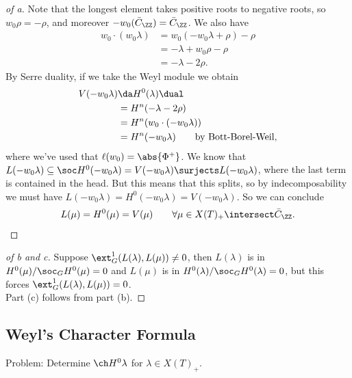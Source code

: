 \begin{proof}[of a]

Note that the longest element takes positive roots to negative roots, so
\(w_0 \rho = - \rho\), and moreover \(-w_0(\bar{C}_\ZZ) = \bar{C}_\ZZ\).
We also have
\begin{align*}
w_0 \cdot ( w_0 \lambda) 
&= w_0 (-w_0 \lambda + \rho) - \rho \\
&= -\lambda + w_0 \rho - \rho \\
&= -\lambda - 2\rho
.\end{align*} By Serre duality, if we take the Weyl module we obtain
\begin{align*}
V(-w_0 \lambda) 
&\da H^0(\lambda)\dual  \\
&= H^n(-\lambda - 2\rho) \\
&= H^n(w_0 \cdot (-w_0 \lambda)) \\
&= H^n(-w_0 \lambda) \qquad\text{by Bott-Borel-Weil}
,\end{align*} where we've used that \(\ell(w_0) = \abs{\Phi^+}\). We
know that
\(L(-w_0 \lambda) \subseteq \soc H^0(-w_0 \lambda) = V(-w_0 \lambda) \surjects L(-w_0 \lambda)\),
where the last term is contained in the head. But this means that this
splits, so by indecomposability we must have
\(L(-w_0 \lambda) = H^0(-w_0 \lambda) = V(-w_0 \lambda)\). So we can
conclude
\begin{align*}  
L(\mu) = H^0(\mu) = V(\mu) \qquad \forall \mu \in X(T)_+ \intersect \bar{C}_\ZZ
.\end{align*}

\end{proof}

\begin{proof}[of b and c]

Suppose \(\ext_G^1(L(\lambda), L(\mu)) \neq 0\), then \(L(\lambda)\) is
in \(H^0(\mu) / \soc_G H^0(\mu) = 0\) and \(L(\mu)\) is in
\(H^0(\lambda) / \soc_G H^0(\lambda) = 0\), but this forces
\(\ext_G^1(L(\lambda), L(\mu)) = 0\).\\

Part (c) follows from part (b).

\end{proof}

\hypertarget{weyls-character-formula}{%
\subsection{Weyl's Character Formula}\label{weyls-character-formula}}

Problem: Determine \(\ch H^0 \lambda\) for \(\lambda \in X(T)_+\).

